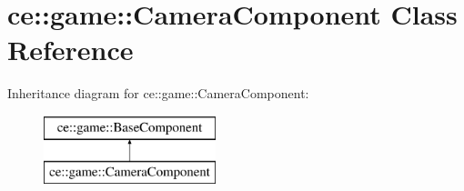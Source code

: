 \hypertarget{classce_1_1game_1_1_camera_component}{}\section{ce\+:\+:game\+:\+:Camera\+Component Class Reference}
\label{classce_1_1game_1_1_camera_component}
Inheritance diagram for ce\+:\+:game\+:\+:Camera\+Component\+:\begin{figure}[H]
\begin{center}
\leavevmode
\includegraphics[height=2.000000cm]{classce_1_1game_1_1_camera_component}
\end{center}
\end{figure}
